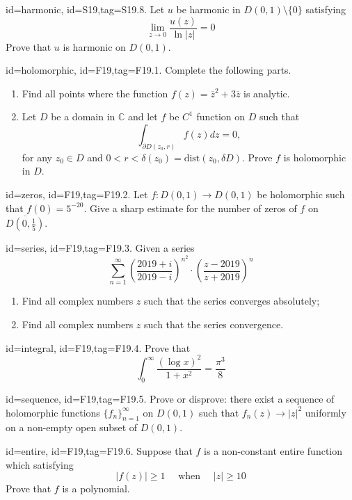 \documentclass[12pt,letterpaper]{article}
\theoremstyle{plain}
\theoremstyle{definition}
\begin{document}
{\item[id=harmonic, id=S19,tag=S19.8.]
Let $u$ be harmonic in $D(0,1) \setminus \{0\}$ satisfying
\[
	\lim_{z\rightarrow 0} \frac{u(z)}{\ln | z |} = 0
\]
Prove that $u$ is harmonic on $D(0,1)$.


\item[id=holomorphic, id=F19,tag=F19.1.]
Complete the following parts.
\begin{enumerate}[label=(\alph*)]\onlyitems
\item Find all points where the function $f(z) = \overline{z}^2 + 3 \overline{z}$ is analytic.
\item Let $D$ be a domain in $\mathbb{C}$ and let $f$ be $C^1$ function on $D$ such that
\[
	\int_{\partial D(z_0, r)} f(z) dz = 0,
\]
for any $z_0 \in D$ and $0 < r < \delta(z_0) = \text{dist}(z_0, \delta D)$. Prove $f$ is holomorphic in $D$.
\end{enumerate}

\item[id=zeros, id=F19,tag=F19.2.]
Let $f : D(0,1) \rightarrow D(0,1)$ be holomorphic such that $f(0) = 5^{-20}$. Give a sharp estimate for the number of zeros of $f$ on $\overline{D(0,\frac{1}{5})}$.

\item[id=series, id=F19,tag=F19.3.]
Given a series
\[
	\sum_{n=1}^{\infty} \left(\frac{2019 + i}{2019 - i}\right)^{n^2} \cdot \left(\frac{z - 2019}{z + 2019}\right)^n
\]
\begin{enumerate}[label=(\roman*)]\onlyitems
\item Find all complex numbers $z$ such that the series converges absolutely;
\item Find all complex numbers $z$ such that the series convergence.
\end{enumerate}

\item[id=integral, id=F19,tag=F19.4.]
Prove that
\[
	\int_{0}^{\infty} \frac{(\log x)^2}{1 + x^2} = \frac{\pi^3}{8}
\]

\item[id=sequence, id=F19,tag=F19.5.]
Prove or disprove: there exist a sequence of holomorphic functions $\{f_n\}_{n=1}^{\infty}$ on $D(0,1)$ such that $f_n(z) \rightarrow | z |^2$ uniformly on a non-empty open subset of $D(0,1)$.

\item[id=entire, id=F19,tag=F19.6.]
Suppose that $f$ is a non-constant entire function which satisfying
\[
	| f(z) | \ge 1 \quad \text{ when } \quad | z | \ge 10
\]
Prove that $f$ is a polynomial.

}
\end{document}
